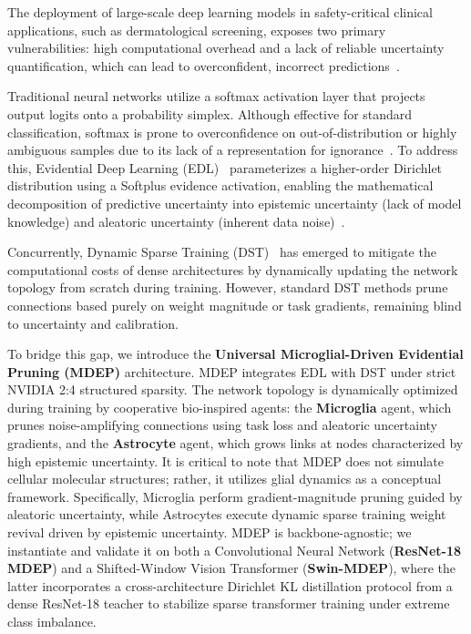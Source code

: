 \documentclass[letterpaper]{article} %
\begin{document}
The deployment of large-scale deep learning models in safety-critical clinical applications, such as dermatological screening, exposes two primary vulnerabilities: high computational overhead and a lack of reliable uncertainty quantification, which can lead to overconfident, incorrect predictions~\cite{he2016deep, dosovitskiy2021image, esteva2017dermatologist, guo2017calibration}. 

Traditional neural networks utilize a softmax activation layer that projects output logits onto a probability simplex. Although effective for standard classification, softmax is prone to overconfidence on out-of-distribution or highly ambiguous samples due to its lack of a representation for ignorance~\cite{lakshminarayanan2017simple, guo2017calibration}. To address this, Evidential Deep Learning (EDL)~\cite{sensoy2018evidential} parameterizes a higher-order Dirichlet distribution using a Softplus evidence activation, enabling the mathematical decomposition of predictive uncertainty into epistemic uncertainty (lack of model knowledge) and aleatoric uncertainty (inherent data noise)~\cite{sensoy2018evidential, malinin2018predictive}.

Concurrently, Dynamic Sparse Training (DST)~\cite{evci2020rigging, mocanu2018scalable} has emerged to mitigate the computational costs of dense architectures by dynamically updating the network topology from scratch during training. However, standard DST methods prune connections based purely on weight magnitude or task gradients, remaining blind to uncertainty and calibration.

To bridge this gap, we introduce the \textbf{Universal Microglial-Driven Evidential Pruning (MDEP)} architecture. MDEP integrates EDL with DST under strict NVIDIA 2:4 structured sparsity. The network topology is dynamically optimized during training by cooperative bio-inspired agents: the \textbf{Microglia} agent, which prunes noise-amplifying connections using task loss and aleatoric uncertainty gradients, and the \textbf{Astrocyte} agent, which grows links at nodes characterized by high epistemic uncertainty. It is critical to note that MDEP does not simulate cellular molecular structures; rather, it utilizes glial dynamics as a conceptual framework. Specifically, Microglia perform gradient-magnitude pruning guided by aleatoric uncertainty, while Astrocytes execute dynamic sparse training weight revival driven by epistemic uncertainty. MDEP is backbone-agnostic; we instantiate and validate it on both a Convolutional Neural Network (\textbf{ResNet-18 MDEP}) and a Shifted-Window Vision Transformer (\textbf{Swin-MDEP}), where the latter incorporates a cross-architecture Dirichlet KL distillation protocol from a dense ResNet-18 teacher to stabilize sparse transformer training under extreme class imbalance.
\end{document}
